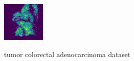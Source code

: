 \documentclass[journal=jacsat,manuscript=article]{achemso}
\begin{document}
\begin{figure}[htbp]
  \centering
  \begin{minipage}[c]{0.9\textwidth}
    {
      \includegraphics[width=\colWidth\textwidth]{pic/coloractal/s25_tumor.png}
    } 
  \end{minipage}
  \caption{tumor colorectal adenocarcinoma dataset}
  \label{fig:tumor colorectal adenocarcinoma dataset}
\end{figure}
\end{document}
